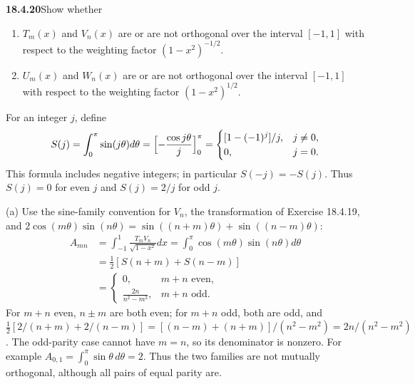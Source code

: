 \par\bigskip
\noindent\textbf{18.4.20}\quad Show whether
\begin{enumerate}
\item[(a)] $T_{m}(x)$ and $V_{n}(x)$ are or are not orthogonal over
the interval $[-1,1]$ with respect to the weighting factor
$(1-x^{2})^{-1/2}$.
\item[(b)] $U_{m}(x)$ and $W_{n}(x)$ are or are not orthogonal over
the interval $[-1,1]$ with respect to the weighting factor
$(1-x^{2})^{1/2}$.
\end{enumerate}
\par\nobreak
\solution
For an integer $j$, define
\[
S(j)=\int_0^\pi\sin(j\theta)d\theta
 =\Bigl[-\frac{\cos j\theta}j\Bigr]_0^\pi
 =\begin{cases}[1-(-1)^j]/j,&j\ne0,\\0,&j=0.\end{cases}
\]
This formula includes negative integers; in particular $S(-j)=-S(j)$.
Thus $S(j)=0$ for even $j$ and $S(j)=2/j$ for odd $j$.

(a) Use the sine-family convention for $V_n$, the transformation
of Exercise 18.4.19, and
$2\cos(m\theta)\sin(n\theta)=\sin((n+m)\theta)+\sin((n-m)\theta)$:
\begin{align*}
A_{mn}&=\int_{-1}^1\frac{T_mV_n}{\sqrt{1-x^2}}dx
 =\int_0^\pi\cos(m\theta)\sin(n\theta)d\theta\\
 &=\tfrac12[S(n+m)+S(n-m)]\\
 &=\boxed{\begin{cases}
 0,&m+n\text{ even},\\[2pt]
 \displaystyle\frac{2n}{n^2-m^2},&m+n\text{ odd}.
 \end{cases}}
\end{align*}
For $m+n$ even, $n\pm m$ are both even; for $m+n$ odd, both are odd,
and $\frac12[2/(n+m)+2/(n-m)]=[(n-m)+(n+m)]/(n^2-m^2)=2n/(n^2-m^2)$.
The odd-parity case cannot have $m=n$, so its denominator is
nonzero.  For example $A_{0,1}=\int_0^\pi\sin\theta\,d\theta=2$.
Thus the two families are not mutually orthogonal, although all
pairs of equal parity are.

